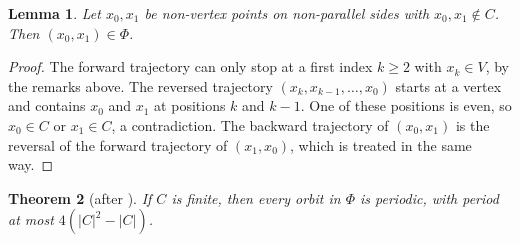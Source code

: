 \documentclass[11pt]{amsart}
\newtheorem{theorem}{Theorem}[section]
\newtheorem{lemma}[theorem]{Lemma}
\theoremstyle{definition}
\theoremstyle{remark}
\begin{document}
\begin{lemma}\label{lem:defined}
Let $x_0,x_1$ be non-vertex points on non-parallel sides with $x_0,x_1\notin C$. Then $(x_0,x_1)\in\Phi$.
\end{lemma}

\begin{proof}
The forward trajectory can only stop at a first index $k\ge2$ with $x_k\in V$, by the remarks above. The reversed trajectory $(x_k,x_{k-1},\dots,x_0)$ starts at a vertex and contains $x_0$ and $x_1$ at positions $k$ and $k-1$. One of these positions is even, so $x_0\in C$ or $x_1\in C$, a contradiction. The backward trajectory of $(x_0,x_1)$ is the reversal of the forward trajectory of $(x_1,x_0)$, which is treated in the same way.
\end{proof}

\begin{theorem}[after {\cite[Theorem~1.1]{ALW26}}]\label{thm:criterion}
If $C$ is finite, then every orbit in $\Phi$ is periodic, with period at most $4(|C|^2-|C|)$.
\end{theorem}
\end{document}
